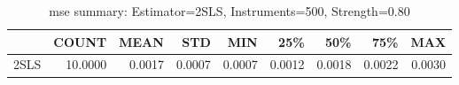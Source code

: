 \begin{table}[ht]
\centering
\caption{mse summary: Estimator=2SLS, Instruments=500, Strength=0.80}
\begin{tabular}{lrrrrrrrr}
\toprule
 & COUNT & MEAN & STD & MIN & 25\% & 50\% & 75\% & MAX \\
\midrule
2SLS & 10.0000 & 0.0017 & 0.0007 & 0.0007 & 0.0012 & 0.0018 & 0.0022 & 0.0030 \\
\bottomrule
\end{tabular}
\end{table}
